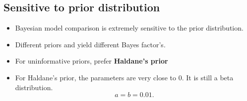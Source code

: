\documentclass{article}
\begin{document}
\subsection{Sensitive to prior distribution}
\begin{itemize}
    \item Bayesian model comparison is extremely sensitive to the prior distribution.
    \item Different priors and yield different Bayes factor's. 
    \item For uninformative priors, prefer \textbf{Haldane's prior}
    \item For Haldane's prior, the parameters are very close to 0. It is still a beta distribution. 
        \[
        a = b = 0.01
        .\] 
\end{itemize}
\end{document}
